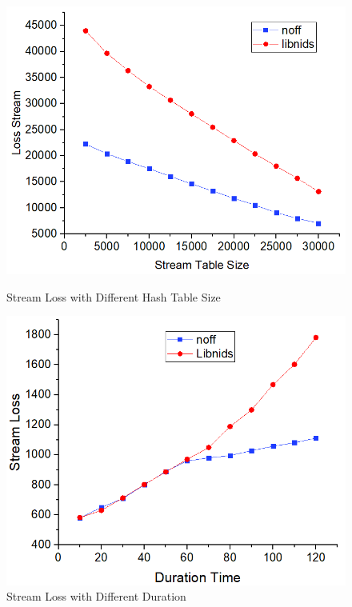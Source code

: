 \documentclass[conference]{IEEEtran}
\begin{document}
\begin{figure}
\begin{minipage}[t]{0.49\linewidth}
\flushleft
\includegraphics[width=\textwidth]{./picture/Figure14.jpg}
\caption{Stream Loss with Different Hash Table Size} 
\label{fig:15}
\end{minipage}
\begin{minipage}[t]{0.49\linewidth}
\flushright
\includegraphics[width=\textwidth]{./picture/Figure15.jpg}
\caption{Stream Loss with Different Duration}
\label{fig:16}
\end{minipage}
\end{figure} 
\end{document}

